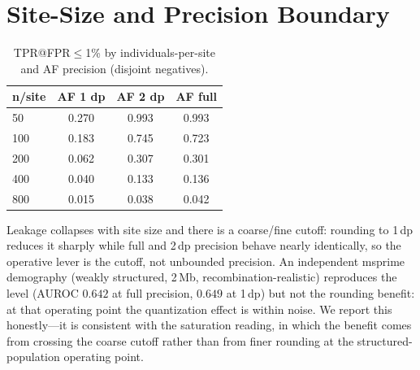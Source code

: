 \documentclass[11pt]{article}
\begin{document}
\section{Site-Size and Precision Boundary}
\label{sec:boundary}
\begin{table}[t]
\centering
\caption{TPR@FPR$\le$1\% by individuals-per-site and AF precision (disjoint
negatives).}
\label{tab:boundary}
\begin{tabular}{lccc}
\toprule
n/site & AF 1 dp & AF 2 dp & AF full \\
\midrule
50 & 0.270 & 0.993 & 0.993 \\
100 & 0.183 & 0.745 & 0.723 \\
200 & 0.062 & 0.307 & 0.301 \\
400 & 0.040 & 0.133 & 0.136 \\
800 & 0.015 & 0.038 & 0.042 \\
\bottomrule
\end{tabular}
\end{table}
Leakage collapses with site size and there is a coarse/fine cutoff: rounding to
1\,dp reduces it sharply while full and 2\,dp precision behave nearly
identically, so the operative lever is the cutoff, not unbounded precision.
An independent msprime demography (weakly structured, 2\,Mb,
recombination-realistic) reproduces the level (AUROC $0.642$ at full precision,
$0.649$ at 1\,dp) but not the rounding benefit: at that operating point the
quantization effect is within noise. We report this honestly---it is consistent
with the saturation reading, in which the benefit comes from crossing the
coarse cutoff rather than from finer rounding at the structured-population
operating point.
\end{document}
